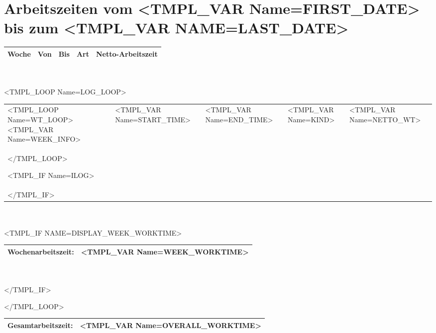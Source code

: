 \documentclass[11pt]{report}
\begin{document}
\setlength{\parindent}{0pt}
\setlength{\parindent}{0pt}
\setlength{\parskip}{1.5ex}



\section*{Arbeitszeiten vom <TMPL_VAR Name=FIRST_DATE> bis zum <TMPL_VAR NAME=LAST_DATE>}

\begin{tabular}{|p{4cm}|p{3.5cm}|p{3.5cm}|p{2cm}|p{2cm}|}
	\hline
	\textbf{Woche} & 
	\textbf{Von} & 
	\textbf{Bis} & 
	\textbf{Art} & 
	\textbf{Netto-Arbeitszeit} \\
	\hline
\end{tabular}
\\
\\

<TMPL_LOOP Name=LOG_LOOP>

\begin{tabular}{|p{4cm}|p{3.5cm}|p{3.5cm}|p{2cm}|p{2cm}|}
	\hline

	\hline
	<TMPL_LOOP Name=WT_LOOP>
         	<TMPL_VAR Name=WEEK_INFO> & 
	        <TMPL_VAR Name=START_TIME> & 
		<TMPL_VAR Name=END_TIME> & 
		<TMPL_VAR Name=KIND> & 
		<TMPL_VAR Name=NETTO_WT> \\
	</TMPL_LOOP> 

	<TMPL_IF Name=ILOG>
	
	\hline
	\multicolumn{5}{|l|}{ \parbox[b]{15cm}{ 

\small { \texttt{
<TMPL_VAR Name=ILOG> 
} }
 } } \\
	\hline
	</TMPL_IF>
	\hline
\end{tabular}
\\
\\
<TMPL_IF NAME=DISPLAY_WEEK_WORKTIME>
\begin{tabular}{|p{14.3cm}|p{2cm}|}
	\hline
	\textbf{Wochenarbeitszeit:} & 
	\textbf{<TMPL_VAR Name=WEEK_WORKTIME> } \\
	\hline
\end{tabular}
\\
\\
</TMPL_IF>

</TMPL_LOOP>

\begin{tabular}{|p{14.3cm}|p{2cm}|}
	\hline
	\textbf{Gesamtarbeitszeit:} & 
	\textbf{<TMPL_VAR Name=OVERALL_WORKTIME> } \\
	\hline
\end{tabular}
\end{document}
